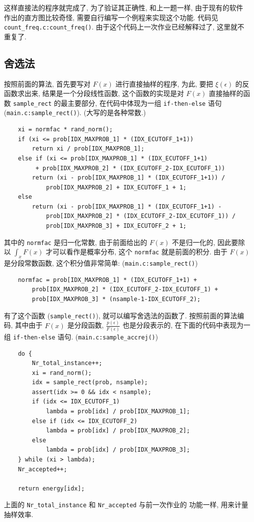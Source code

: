 \documentclass{ctexart}
\begin{document}
这样直接法的程序就完成了, 为了验证其正确性, 和上一题一样, 由于现有的软件
作出的直方图比较奇怪, 需要自行编写一个例程来实现这个功能. 代码见
\verb|count_freq.c:count_freq()|. 由于这个代码上一次作业已经解释过了,
这里就不重复了.

\subsection{舍选法}
按照前面的算法, 首先要写对 $F(x)$ 进行直接抽样的程序, 为此, 要把 $\xi(\epsilon)$
的反函数求出来, 结果是一个分段线性函数, 这个函数的实现是对 $F(x)$ 直接抽样的函数
\verb|sample_rect| 的最主要部分, 在代码中体现为一组 \verb|if-then-else|
语句 (\verb|main.c:sample_rect()|). (大写的是各种常数.)
\begin{verbatim}
    xi = normfac * rand_norm();
    if (xi <= prob[IDX_MAXPROB_1] * (IDX_ECUTOFF_1+1))
        return xi / prob[IDX_MAXPROB_1];
    else if (xi <= prob[IDX_MAXPROB_1] * (IDX_ECUTOFF_1+1)
         + prob[IDX_MAXPROB_2] * (IDX_ECUTOFF_2-IDX_ECUTOFF_1))
        return (xi - prob[IDX_MAXPROB_1] * (IDX_ECUTOFF_1+1)) /
            prob[IDX_MAXPROB_2] + IDX_ECUTOFF_1 + 1;
    else
        return (xi - prob[IDX_MAXPROB_1] * (IDX_ECUTOFF_1+1) -
            prob[IDX_MAXPROB_2] * (IDX_ECUTOFF_2-IDX_ECUTOFF_1)) /
            prob[IDX_MAXPROB_3] + IDX_ECUTOFF_2 + 1;
\end{verbatim}
其中的 \verb|normfac| 是归一化常数, 由于前面给出的 $F(x)$ 不是归一化的, 因此要除以
$\int_x F(x)$ 才可以看作是概率分布, 这个 \verb|normfac| 就是前面的积分. 由于 $F(x)$
是分段常数函数, 这个积分值非常简单: (\verb|main.c:sample_rect()|)
\begin{verbatim}
    normfac = prob[IDX_MAXPROB_1] * (IDX_ECUTOFF_1+1) +
        prob[IDX_MAXPROB_2] * (IDX_ECUTOFF_2-IDX_ECUTOFF_1) +
        prob[IDX_MAXPROB_3] * (nsample-1-IDX_ECUTOFF_2);
\end{verbatim}

有了这个函数 (\verb|sample_rect()|), 就可以编写舍选法的函数了. 按照前面的算法编码,
其中由于 $F(x)$ 是分段函数, $\frac{p(\epsilon)}{F(\epsilon)}$ 也是分段表示的,
在下面的代码中表现为一组 \verb|if-then-else| 语句. (\verb|main.c:sample_accrej()|)
\begin{verbatim}
    do {
        Nr_total_instance++;
        xi = rand_norm();
        idx = sample_rect(prob, nsample);
        assert(idx >= 0 && idx < nsample);
        if (idx <= IDX_ECUTOFF_1)
            lambda = prob[idx] / prob[IDX_MAXPROB_1];
        else if (idx <= IDX_ECUTOFF_2)
            lambda = prob[idx] / prob[IDX_MAXPROB_2];
        else
            lambda = prob[idx] / prob[IDX_MAXPROB_3];
    } while (xi > lambda);
    Nr_accepted++;

    return energy[idx];
\end{verbatim}
上面的 \verb|Nr_total_instance| 和 \verb|Nr_accepted| 与前一次作业的
功能一样, 用来计量抽样效率.
\end{document}
